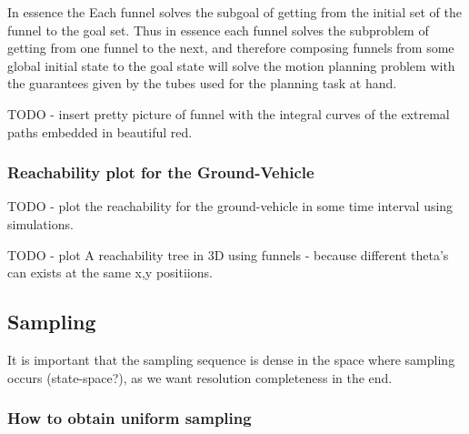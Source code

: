 In essence the Each funnel solves the subgoal of getting from the initial set of
the funnel to the goal set. Thus in essence each funnel solves the subproblem of
getting from one funnel to the next, and therefore composing funnels from some
global initial state to the goal state will solve the motion planning problem
with the guarantees given by the tubes used for the planning task at hand.

TODO - insert pretty picture of funnel with the integral curves of the extremal
paths embedded in beautiful red.

\subsubsection{Reachability plot for the Ground-Vehicle}
TODO - plot the reachability for the ground-vehicle in some time interval using
simulations.

TODO - plot A reachability tree in 3D using funnels - because different theta's
can exists at the same x,y positiions.

\subsection{Sampling}
It is important that the sampling sequence is dense in the space where sampling
occurs (state-space?), as we want resolution completeness in the end.
\subsubsection{How to obtain uniform sampling}
